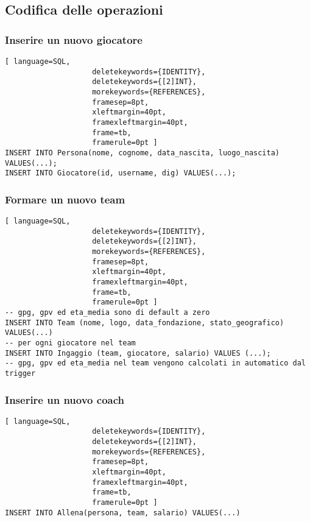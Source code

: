 \documentclass{article}
\begin{document}
\subsection{Codifica delle operazioni}

\subsubsection{Inserire un nuovo giocatore}
\begin{lstlisting}[ language=SQL,
                    deletekeywords={IDENTITY},
                    deletekeywords={[2]INT},
                    morekeywords={REFERENCES},
                    framesep=8pt,
                    xleftmargin=40pt,
                    framexleftmargin=40pt,
                    frame=tb,
                    framerule=0pt ]
INSERT INTO Persona(nome, cognome, data_nascita, luogo_nascita) VALUES(...);
INSERT INTO Giocatore(id, username, dig) VALUES(...);
\end{lstlisting}

\subsubsection{Formare un nuovo team}
\begin{lstlisting}[ language=SQL,
                    deletekeywords={IDENTITY},
                    deletekeywords={[2]INT},
                    morekeywords={REFERENCES},
                    framesep=8pt,
                    xleftmargin=40pt,
                    framexleftmargin=40pt,
                    frame=tb,
                    framerule=0pt ]
-- gpg, gpv ed eta_media sono di default a zero
INSERT INTO Team (nome, logo, data_fondazione, stato_geografico) VALUES(...)
-- per ogni giocatore nel team
INSERT INTO Ingaggio (team, giocatore, salario) VALUES (...);
-- gpg, gpv ed eta_media nel team vengono calcolati in automatico dal trigger
\end{lstlisting}

\subsubsection{Inserire un nuovo coach}
\begin{lstlisting}[ language=SQL,
                    deletekeywords={IDENTITY},
                    deletekeywords={[2]INT},
                    morekeywords={REFERENCES},
                    framesep=8pt,
                    xleftmargin=40pt,
                    framexleftmargin=40pt,
                    frame=tb,
                    framerule=0pt ]
INSERT INTO Allena(persona, team, salario) VALUES(...)
\end{lstlisting}
\end{document}
